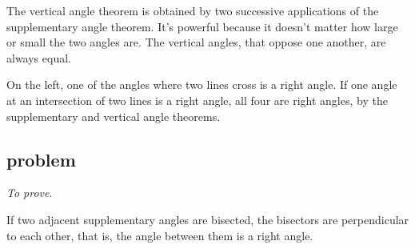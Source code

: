 \documentclass[11pt, oneside]{article}
\begin{document}
The vertical angle theorem is obtained by two successive applications of the supplementary angle theorem.  It's powerful  because it doesn't matter how large or small the two angles are.  The vertical angles, that oppose one another, are always equal.

On the left, one of the angles where two lines cross is a right angle.  If one angle at an intersection of two lines is a right angle, all four are right angles, by the supplementary and vertical angle theorems.

\subsection*{problem}

\emph{To prove}.  

If two adjacent supplementary angles are bisected, the bisectors are perpendicular to each other, that is, the angle between them is a right angle.
\end{document}
